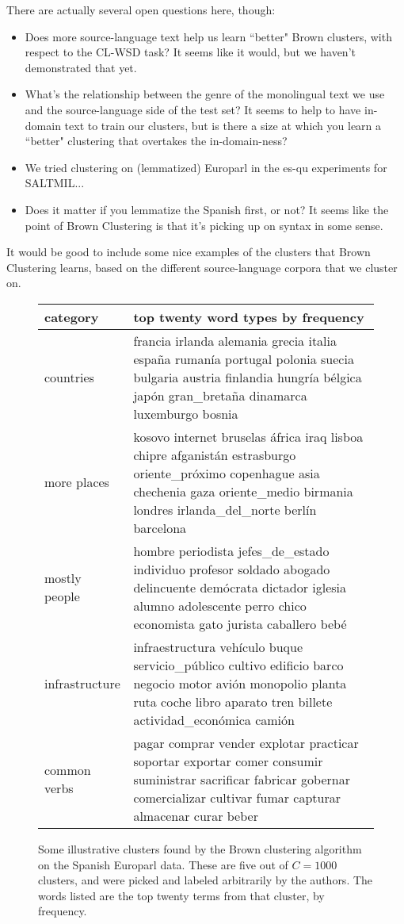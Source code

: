 There are actually several open questions here, though:

\begin{itemize}
  \item Does more source-language text help us learn ``better" Brown clusters,
    with respect to the CL-WSD task? It seems like it would, but we haven't
    demonstrated that yet.
  \item What's the relationship between the genre of the monolingual text we
    use and the source-language side of the test set? It seems to help to have
    in-domain text to train our clusters, but is there a size at which you
    learn a ``better" clustering that overtakes the in-domain-ness?
  \item We tried clustering on (lemmatized) Europarl in the es-qu experiments for SALTMIL...
  \item Does it matter if you lemmatize the Spanish first, or not? It seems
    like the point of Brown Clustering is that it's picking up on syntax in
    some sense.
\end{itemize}

It would be good to include some nice examples of the clusters that Brown
Clustering learns, based on the different source-language corpora that we
cluster on.


\begin{figure*}[t!]
  \begin{tabular}{|l|p{15cm}|}
    \hline
    category  & top twenty word types by frequency \\
    \hline
    countries & francia irlanda alemania grecia italia españa rumanía portugal polonia suecia bulgaria austria finlandia hungría bélgica japón gran\_bretaña dinamarca luxemburgo bosnia \\
    \hline
    more places & kosovo internet bruselas áfrica iraq lisboa chipre afganistán estrasburgo oriente\_próximo copenhague asia chechenia gaza oriente\_medio birmania londres irlanda\_del\_norte berlín barcelona \\
    \hline
    mostly people & hombre periodista jefes\_de\_estado individuo profesor soldado abogado delincuente demócrata dictador iglesia alumno adolescente perro chico economista gato jurista caballero bebé \\
    \hline
    infrastructure & infraestructura vehículo buque servicio\_público cultivo edificio barco negocio motor avión monopolio planta ruta coche libro aparato tren billete actividad\_económica camión \\
    \hline
    common verbs & pagar comprar vender explotar practicar soportar exportar comer consumir suministrar sacrificar fabricar gobernar comercializar cultivar fumar capturar almacenar curar beber \\
    \hline
  \end{tabular}
\caption{Some illustrative clusters found by the Brown clustering algorithm on
the Spanish Europarl data. These are five out of $C=1000$ clusters, and
were picked and labeled arbitrarily by the authors. The words listed are the
top twenty terms from that cluster, by frequency.}
\label{fig:clusters}
\end{figure*}

